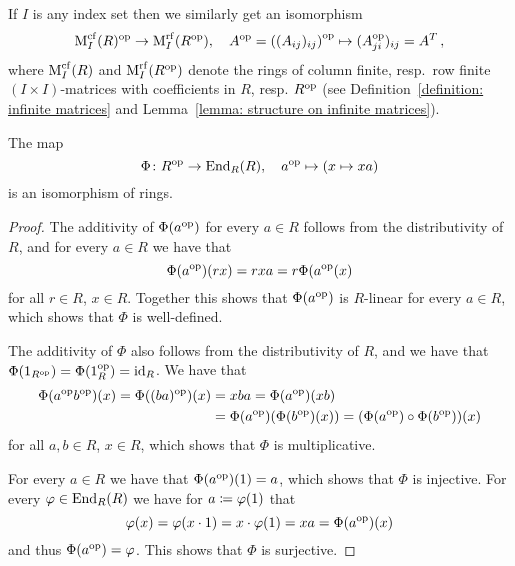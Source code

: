 \begin{remark}
  \label{remark: transposing infinite matrix ring opposite ring}
  If $I$ is any index set then we similarly get an isomorphism
  \[
            \operatorname{M}_I^{\operatorname{cf}}(R)^{\operatorname{op}}
    \to
            \operatorname{M}_I^{{\operatorname{rf}}}(R^{\operatorname{op}}),
    \quad   A^{\operatorname{op}}
    =       \left( (A_{ij})_{ij} \right)^{{\operatorname{op}}}
    \mapsto (A_{ji}^{\operatorname{op}})_{ij}
    =       A^T \,,
  \]
  where $\operatorname{M}_I^{\operatorname{cf}}(R)$ and $\operatorname{M}_I^{\operatorname{rf}}(R^{\operatorname{op}})$ denote the rings of column finite, resp.\ row finite $(I \times I)$-matrices with coefficients in $R$, resp. $R^{\operatorname{op}}$ (see Definition~\ref{definition: infinite matrices} and Lemma~\ref{lemma: structure on infinite matrices}).
\end{remark}


\begin{lemma}
  \label{lemma: End_R(R) = Rop}
  The map
  \[
              \Phi
    \colon    R^{\operatorname{op}}
    \to       \operatorname{End}_R(R),
    \quad     a^{\operatorname{op}}
    \mapsto   (x \mapsto xa)
  \]
  is an isomorphism of rings.
\end{lemma}


\begin{proof}
  The additivity of $\Phi(a^{\operatorname{op}})$ for every $a \in R$ follows from the distributivity of $R$, and for every $a \in R$ we have that
  \[
      \Phi(a^{\operatorname{op}})(rx)
    = r x a
    = r \Phi(a^{\operatorname{op}}(x)
  \]
  for all $r \in R$, $x \in R$.
  Together this shows that $\Phi(a^{\operatorname{op}})$ is $R$-linear for every $a \in R$, which shows that $\Phi$ is well-defined.
  
  The additivity of $\Phi$ also follows from the distributivity of $R$, and we have that $\Phi(1_{R^{\operatorname{op}}}) = \Phi(1_R^{\operatorname{op}}) = \operatorname{id}_R$.
  We have that
  \begin{align*}
        \Phi(a^{\operatorname{op}} b^{\operatorname{op}})(x)
     =  \Phi((ba)^{\operatorname{op}})(x)
    &=  x b a
     =  \Phi(a^{\operatorname{op}})(x b)  \\
    &=  \Phi(a^{\operatorname{op}})(\Phi(b^{\operatorname{op}})(x))
     =  (\Phi(a^{\operatorname{op}}) \circ \Phi(b^{\operatorname{op}}))(x)
  \end{align*}
  for all $a, b \in R$, $x \in R$, which shows that $\Phi$ is multiplicative.
  
  For every $a \in R$ we have that $\Phi(a^{\operatorname{op}})(1) = a$, which shows that $\Phi$ is injective.
  For every $\varphi \in \operatorname{End}_R(R)$ we have for $a \coloneqq \varphi(1)$ that
  \[
      \varphi(x)
    = \varphi(x \cdot 1)
    = x \cdot \varphi(1)
    = x a
    = \Phi(a^{\operatorname{op}})(x)
  \]
  and thus $\Phi(a^{\operatorname{op}}) = \varphi$.
  This shows that $\Phi$ is surjective.
\end{proof}


